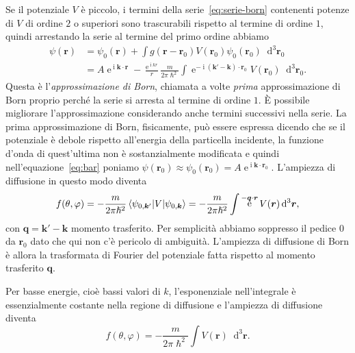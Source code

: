 \documentclass[a4paper,fleqn,twoside,12pt]{article}
\renewcommand{\phi}{\varphi}
\newcommand*{\dd}{\mathop{}\!\mathrm{d}} %
\DeclareMathOperator{\e}{\mathrm{e}} %
\DeclareMathOperator{\uimm}{\mathrm{i}} %
\begin{document}
Se il potenziale $V$ è piccolo, i termini della serie~\eqref{eq:serie-born}
contenenti potenze di $V$ di ordine $2$ o superiori sono trascurabili rispetto
al termine di ordine $1$, quindi arrestando la serie al termine del primo ordine
abbiamo
\begin{equation}
  \begin{split}
    \psi(\bm{r}) &= \psi_{0}(\bm{r}) + \int g(\bm{r} - \bm{r}_{0}) V(\bm{r}_{0})
    \psi_{0}(\bm{r}_{0}) \dd^{3}\bm{r}_{0} \\
    &= A\e^{\uimm \bm{k}\cdot\bm{r}} - \frac{\e^{\uimm kr}}{r}
    \frac{m}{2\pi\hslash^{2}}\int \e^{-\uimm (\bm{k}' - \bm{k})\cdot\bm{r}_{0}}
    V(\bm{r}_{0}) \dd^{3} \bm{r}_{0}.
  \end{split}
\end{equation}
Questa è l'\emph{approssimazione di Born}, chiamata a volte \emph{prima}
approssimazione di Born proprio perché la serie si arresta al termine di ordine
$1$.  È possibile migliorare l'approssimazione considerando anche termini
successivi nella serie.  La prima approssimazione di Born, fisicamente, può
essere espressa dicendo che se il potenziale è debole rispetto all'energia della
particella incidente, la funzione d'onda di quest'ultima non è sostanzialmente
modificata e quindi nell'equazione~\eqref{eq:bar} poniamo
$\psi(\bm{r}_{0}) \approx \psi_{0}(\bm{r}_{0}) =
A\e^{\uimm \bm{k}\cdot\bm{r}_{0}}$.
L'ampiezza di diffusione in questo modo diventa
\begin{equation}
  f(\theta,\phi) = -\frac{m}{2\pi\hslash^{2}} \braket{\psi_{0,\bm{k}'} | V |
    \psi_{0,\bm{k}}} = -\frac{m}{2\pi\hslash^{2}} \int \e^{-\bm{q}\cdot\bm{r}}
  V(\bm{r}) \dd^{3} \bm{r},
\end{equation}
con $\bm{q} = \bm{k}' - \bm{k}$ momento trasferito.  Per semplicità abbiamo
soppresso il pedice $0$ da $\bm{r}_{0}$ dato che qui non c'è pericolo di
ambiguità.  L'ampiezza di diffusione di Born è allora la trasformata di Fourier
del potenziale fatta rispetto al momento trasferito $\bm{q}$.

Per basse energie, cioè bassi valori di $k$, l'esponenziale nell'integrale è
essenzialmente costante nella regione di diffusione e l'ampiezza di diffusione
diventa
\begin{equation}
  f(\theta,\phi) = -\frac{m}{2\pi\hslash^{2}} \int V(\bm{r}) \dd^{3}
  \bm{r}.
\end{equation}
\end{document}
